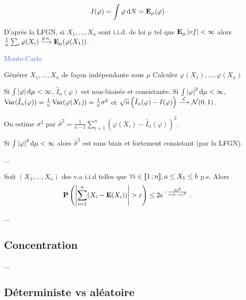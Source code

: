 $$I(\varphi) = \int \varphi \mathop{}\mathopen{}\mathrm{d} N = \mathbf{E}_\mu(\varphi)$$

D'après la LFGN, si $X_1,\ldots,X_n$ sont i.i.d. de loi $\mu$ tel que $\mathbf{E}_\mu \left\lvert vf\right\rvert < \infty$ alors $\frac{1}{n} \sum_i \varphi(X_i) \overset{\text{p.s.}}{\longrightarrow} \mathbf{E}_\mu (\varphi(X_1))$.

\begin{algorithm}[h]
\caption{\textcolor{RoyalBlue}{Monte-Carlo}}
	Générer $X_1,\ldots,X_n$ de façon indépendante sous $\mu$ \;
	Calculer $\varphi(X_1),\ldots,\varphi(X_n)$ \;
\end{algorithm}

\begin{pop}
	Si $\int \left\lvert\varphi\right\rvert \mathop{}\mathopen{}\mathrm{d} \mu < \infty$, $\hat{I}_n(\varphi)$ est non-biaisée et consistante.
	Si $\int \left\lvert\varphi\right\rvert^2 \mathop{}\mathopen{}\mathrm{d} \mu < \infty$, $\operatorname{Var}(\hat{I}_n(\varphi)) = \frac{1}{n} \operatorname{Var}(\varphi(X_1)) = \frac{1}{n} \sigma^2$ et $\sqrt{n} \left( \hat{I}_n(\varphi) - I(\varphi) \right) \overset{\mathcal{L}}{\longrightarrow} \mathcal{N}(0,1)$.
\end{pop}

On estime $\sigma^2$ par $\hat{\sigma}^2 = \frac{1}{n - 1} \sum_{i = 1}^n \left( \varphi(X_i) - \hat{I}_n(\varphi) \right)^2$.

\begin{pop}
	Si $\int \left\lvert\varphi\right\rvert^2 \mathop{}\mathopen{}\mathrm{d} \mu < \infty$ alors $\hat \sigma^2$ est sans biais et fortement consistant (par la LFGN).
\end{pop}

...

\begin{thm}
	Soit $(X_1,\ldots,X_n)$ des v.a i.i.d telles que $\forall i \in \mathopen{[\![}1\mathclose{}\mathpunct{};n\mathclose{]\!]}, a \leq X_1 \leq b$ p.s.
	Alors
	$$\mathbf{P} \left( \left\lvert\sum_{i = 1}^n (X_i - \mathbf{E}(X_i)) \right\rvert > \varepsilon \right) \leq 2 e^{- \frac{3 \varepsilon^2}{n(b - a)^2}}\ .$$
\end{thm}

...


\subsection{Concentration}

	...


\subsection{Déterministe vs aléatoire}

